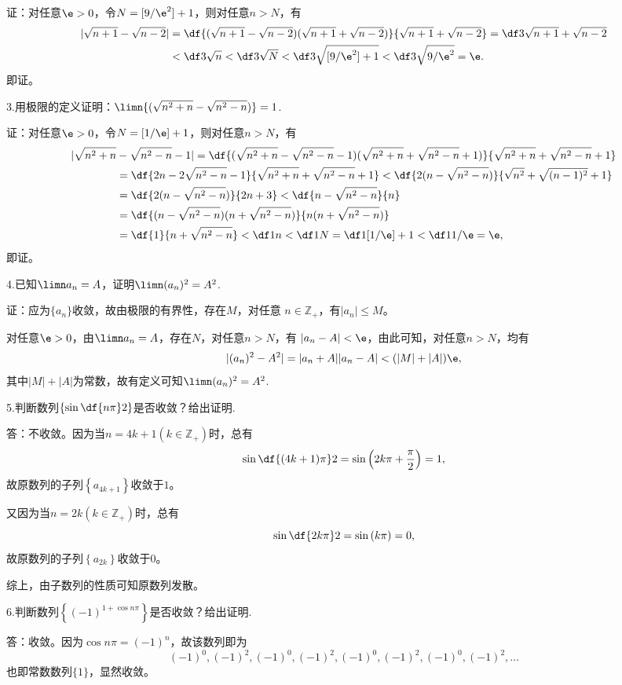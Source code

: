 证：对任意$\e>0$，令$N=[9/\e^2]+1$，则对任意$n>N$，有
\begin{align*}
	|\sqrt{n+1}-\sqrt{n-2}|
	&=\df{(\sqrt{n+1}-\sqrt{n-2})(\sqrt{n+1}+\sqrt{n-2})}
	{\sqrt{n+1}+\sqrt{n-2}}
	=\df3{\sqrt{n+1}+\sqrt{n-2}}\\
	&<\df3{\sqrt{n}}<\df3{\sqrt{N}}<\df3{\sqrt{[9/\e^2]+1}}
	<\df3{\sqrt{9/\e^2}}=\e.
\end{align*}
即证。\fin

\bs
3.用极限的定义证明：$\limn{(\sqrt{n^2+n}-\sqrt{n^2-n})}=1$.

证：对任意$\e>0$，令$N=[1/\e]+1$，则对任意$n>N$，有
\begin{align*}
	|\sqrt{n^2+n}&-\sqrt{n^2-n}-1|
	=\df{(\sqrt{n^2+n}-\sqrt{n^2-n}-1)(\sqrt{n^2+n}+\sqrt{n^2-n}+1)}
	{\sqrt{n^2+n}+\sqrt{n^2-n}+1}\\
	&=\df{2n-2\sqrt{n^2-n}-1}{\sqrt{n^2+n}+\sqrt{n^2-n}+1}
	<\df{2(n-\sqrt{n^2-n})}{\sqrt{n^2}+\sqrt{(n-1)^2}+1}\\
	&=\df{2(n-\sqrt{n^2-n})}{2n+3}
	<\df{n-\sqrt{n^2-n}}{n}\\
	&=\df{(n-\sqrt{n^2-n})(n+\sqrt{n^2-n})}{n(n+\sqrt{n^2-n})}\\
	&=\df{1}{n+\sqrt{n^2-n}}<\df1n<\df1N
	=\df1{[1/\e]+1}<\df1{1/\e}=\e,
\end{align*}
即证。\fin

\bs
4.已知$\limn a_n=A$，证明$\limn(a_n)^2=A^2$.

证：应为$\{a_n\}$收敛，故由极限的有界性，存在$M$，对任意
$n\in\mathbb{Z}_+$，有$|a_n|\leq M$。

对任意$\e>0$，由$\limn a_n=A$，存在$N$，对任意$n>N$，有
$|a_n-A|<\e$，由此可知，对任意$n>N$，均有
$$|(a_n)^2-A^2|=|a_n+A||a_n-A|<(|M|+|A|)\e,$$
其中$|M|+|A|$为常数，故有定义可知$\limn(a_n)^2=A^2$.
\fin

\bs
5.判断数列$\left\{\sin\df{n\pi}2\right\}$是否收敛？给出证明.

答：不收敛。因为当$n=4k+1(k\in\mathbb{Z}_+)$时，总有
$$\sin\df{(4k+1)\pi}2=\sin\left(2k\pi+\frac{\pi}2\right)=1,$$
故原数列的子列$\left\{a_{4k+1}\right\}$收敛于$1$。

又因为当$n=2k(k\in\mathbb{Z}_+)$时，总有
$$\sin\df{2k\pi}2=\sin\left(k\pi\right)=0,$$
故原数列的子列$\left\{a_{2k}\right\}$收敛于$0$。

综上，由子数列的性质可知原数列发散。\fin

\bs
6.判断数列$\left\{(-1)^{1+\cos n\pi}\right\}$是否收敛？给出证明.

答：收敛。因为$\cos n\pi=(-1)^{n}$，故该数列即为
$$(-1)^0,(-1)^2,(-1)^0,(-1)^2,(-1)^0,(-1)^2,(-1)^0,(-1)^2,\ldots$$
也即常数数列$\{1\}$，显然收敛。\fin

